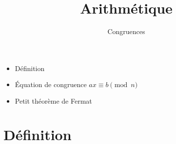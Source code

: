 










\title{{\bf Arithmétique}}
\subtitle{Congruences}

\begin{frame}
  
  \debutmontitre

  \pause

{\footnotesize
\hfill
{}
\begin{minipage}{0.6\textwidth}
  \begin{itemize}
    \item<3-> Définition
    \item<4-> \'Equation de congruence $ax \equiv b \pmod n$
    \item<5-> Petit théorème de Fermat    
  \end{itemize}
\end{minipage}
}

\end{frame}

\setcounter{framenumber}{0}



 

\section{Définition}

